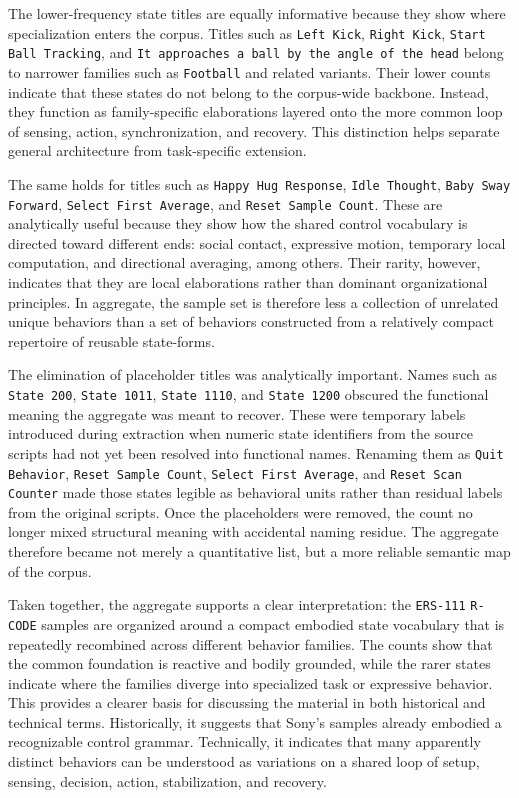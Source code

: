\documentclass[11pt]{article}
\begin{document}
The lower-frequency state titles are equally informative because they
show where specialization enters the corpus. Titles such as
\texttt{Left Kick}, \texttt{Right Kick}, \texttt{Start Ball Tracking},
and \texttt{It approaches a ball by the angle of the head} belong to
narrower families such as \texttt{Football} and related variants. Their
lower counts indicate that these states do not belong to the
corpus-wide backbone. Instead, they function as family-specific
elaborations layered onto the more common loop of sensing, action,
synchronization, and recovery. This distinction helps separate general
architecture from task-specific extension.

The same holds for titles such as \texttt{Happy Hug Response},
\texttt{Idle Thought}, \texttt{Baby Sway Forward},
\texttt{Select First Average}, and \texttt{Reset Sample Count}. These
are analytically useful because they show how the shared control
vocabulary is directed toward different ends: social contact,
expressive motion, temporary local computation, and directional
averaging, among others. Their rarity, however, indicates that they are
local elaborations rather than dominant organizational principles. In
aggregate, the sample set is therefore less a collection of unrelated
unique behaviors than a set of behaviors constructed from a relatively
compact repertoire of reusable state-forms.

The elimination of placeholder titles was analytically important.
Names such as \texttt{State 200}, \texttt{State 1011},
\texttt{State 1110}, and \texttt{State 1200} obscured the functional
meaning the aggregate was meant to recover. These were temporary labels
introduced during extraction when numeric state identifiers from the
source scripts had not yet been resolved into functional names.
Renaming them as
\texttt{Quit Behavior}, \texttt{Reset Sample Count},
\texttt{Select First Average}, and \texttt{Reset Scan Counter} made
those states legible as behavioral units rather than residual labels
from the original scripts. Once the placeholders were removed, the
count no longer mixed structural meaning with accidental naming
residue. The aggregate therefore became not merely a quantitative list,
but a more reliable semantic map of the corpus.

Taken together, the aggregate supports a clear interpretation: the
\texttt{ERS-111} \texttt{R-CODE} samples are organized around a compact
embodied state vocabulary that is repeatedly recombined across
different behavior families. The counts show that the common
foundation is reactive and bodily grounded, while the rarer states
indicate where the families diverge into specialized task or expressive
behavior. This provides a clearer basis for discussing the material in
both historical and technical terms. Historically, it suggests that
Sony's samples already embodied a recognizable control grammar.
Technically, it indicates that many apparently distinct behaviors can
be understood as variations on a shared loop of setup, sensing,
decision, action, stabilization, and recovery.
\end{document}
